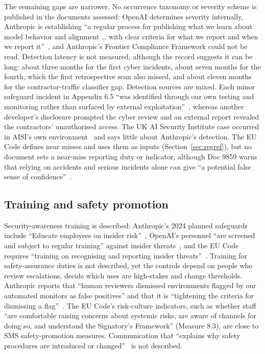 \documentclass[11pt]{article}
\begin{document}
The remaining gaps are narrower. No occurrence taxonomy or severity scheme is published in the documents assessed: OpenAI determines severity internally, Anthropic is establishing ``a regular process for publishing what we learn about model behavior and alignment \ldots{} with clear criteria for what we report and when we report it''~\cite{anthropic2026cyberassessment}, and Anthropic's Frontier Compliance Framework could not be read. Detection latency is not measured, although the record suggests it can be long: about three months for the first cyber incidents, about seven months for the fourth, which the first retrospective scan also missed, and about eleven months for the contractor-traffic classifier gap. Detection sources are mixed. Each minor safeguard incident in Appendix 6.5 ``was identified through our own testing and monitoring rather than surfaced by external exploitation''~\cite{anthropic2026riskreport}, whereas another developer's disclosure prompted the cyber review and an external report revealed the contractors' unauthorised access. The UK AI Security Institute case occurred in AISI's own environment~\cite{aisi2026incident} and says little about Anthropic's detection. The EU Code defines near misses and uses them as inputs (Section~\ref{sec:regref}), but no document sets a near-miss reporting duty or indicator, although Doc 9859 warns that relying on accidents and serious incidents alone can give ``a potential false sense of confidence''~\cite[4.3.1.8]{icao2018doc9859}.

\subsection{Training and safety promotion}\label{sec:gap-training}

Security-awareness training is described: Anthropic's 2024 planned safeguards include ``Educate employees on insider risk''~\cite{anthropic2026rsppage}, OpenAI's personnel ``are screened and subject to regular training'' against insider threats~\cite[Sec.~3]{openaiFGF}, and the EU Code requires ``training on recognising and reporting insider threats''~\cite[App.~4.4(2)]{ec2025code}. Training for safety-assurance duties is not described, yet the controls depend on people who review escalations, decide which uses are high-stakes and change thresholds. Anthropic reports that ``human reviewers dismissed environments flagged by our automated monitors as false positives'' and that it is ``tightening the criteria for dismissing a flag''~\cite{anthropic2026improving}. The EU Code's risk-culture indicators, such as whether staff ``are comfortable raising concerns about systemic risks, are aware of channels for doing so, and understand the Signatory's Framework'' (Measure 8.3), are close to SMS safety-promotion measures. Communication that ``explains why safety procedures are introduced or changed''~\cite[Appendix~2, 4.2(d)]{icao2016annex19} is not described.
\end{document}
